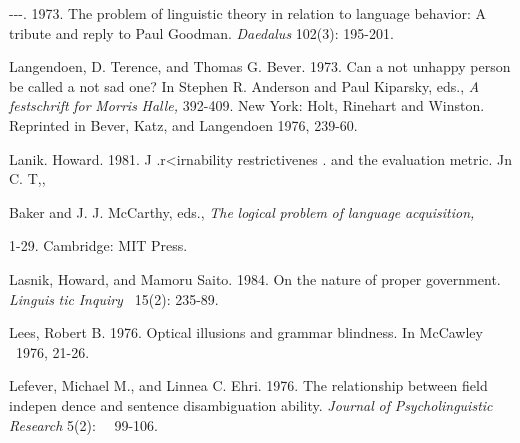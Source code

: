 \begin{styleStandard}
{}-{}-{}-. 1973. The problem of linguistic theory in relation to language behavior: A tribute and reply to Paul Goodman. \textit{Daedalus }102(3): 195-201.
\end{styleStandard}


\begin{styleStandard}
Langendoen, D. Terence, and Thomas G. Bever. 1973. Can a not unhappy person be called a not sad one? In Stephen R. Anderson and Paul Kiparsky, eds., \textit{A}\textit{ }\textit{festschrift}\textit{ }\textit{for}\textit{ }\textit{Morris}\textit{ }\textit{Halle,}\textit{ }392-409. New York: Holt, Rinehart and Winston. Reprinted in Bever, Katz, and Langendoen 1976, 239-60.
\end{styleStandard}


\begin{styleStandard}
Lanik. Howard. 1981. J .r{\textless}irnability restrictivenes . and the evaluation metric. Jn C. T,,
\end{styleStandard}


\begin{styleStandard}
Baker and J. J. McCarthy, eds., \textit{The}\textit{ }\textit{logical}\textit{ }\textit{problem}\textit{ }\textit{of}\textit{ }\textit{language}\textit{ }\textit{acquisition,}
\end{styleStandard}


\begin{styleStandard}
1-29. Cambridge: MIT Press.
\end{styleStandard}


\begin{styleStandard}
Lasnik, Howard, and Mamoru Saito. 1984. On the nature of proper government. \textit{Linguis\-}\textit{ }\textit{tic}\textit{ }\textit{Inquiry }\textit{\ }15(2): 235-89.
\end{styleStandard}


\begin{styleStandard}
Lees, Robert B. 1976. Optical illusions and grammar blindness. In McCawley \ 1976, 21-26.
\end{styleStandard}


\begin{styleStandard}
Lefever, Michael M., and Linnea C. Ehri. 1976. The relationship between field indepen\- dence and sentence disambiguation ability. \textit{Journal}\textit{ }\textit{of}\textit{ }\textit{Psycholinguistic}\textit{ }\textit{Research}\textit{ }5(2): \ \ 99-106.
\end{styleStandard}


